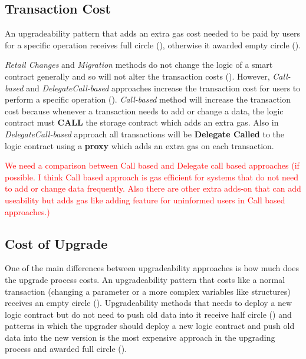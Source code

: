 \subsection{Transaction Cost}
 
 An upgradeability pattern that adds an extra gas cost needed to be paid by users for a specific operation receives full circle (\CIRCLE), otherwise it awarded empty circle (\Circle).

\textit{Retail Changes} and \textit{Migration} methods do not change the logic of a smart contract generally and so will not alter the transaction costs (\Circle). However, \textit{Call-based} and \textit{DelegateCall-based} approaches increase the transaction cost for users to perform a specific operation (\CIRCLE). \textit{Call-based} method will increase the transaction cost because whenever a transaction needs to add or change a data, the logic contract must \textbf{CALL} the storage contract which adds an extra gas. Also in \textit{DelegateCall-based} approach all transactions will be \textbf{Delegate Called} to the logic contract using a \textbf{proxy} which adds an extra gas on each transaction. 

\textcolor{red}{We need a comparison between Call based and Delegate call based approaches (if possible. I think Call based approach is gas efficient for systems that do not need to add or change data frequently. Also there are other extra adds-on that can add useability but adds gas like adding feature for uninformed users in Call based approaches.)}


 \subsection{Cost of Upgrade}

 One of the main differences between upgradeability approaches is how much does the upgrade process costs. An upgradeability pattern that costs like a normal transaction (\eg changing a parameter or a more complex variables like structures) receives an empty circle (\Circle). Upgradeability methods that needs to deploy a new logic contract but do not need to push old data into it receive half circle (\LEFTcircle) and patterns in which the upgrader should deploy a new logic contract and push old data into the new version is the most expensive approach in the upgrading process and awarded full circle (\CIRCLE).
 
 

